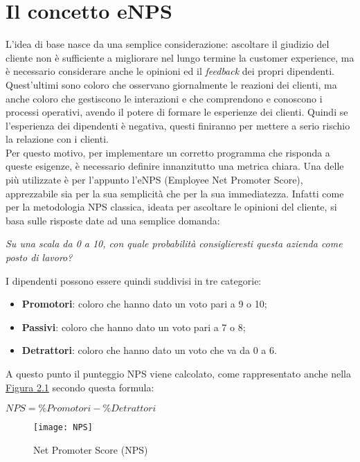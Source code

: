 \section{Il concetto eNPS}
\label{concetto eNPS}
L'idea di base nasce da una semplice considerazione: ascoltare il giudizio del cliente non è sufficiente a migliorare nel lungo termine la \gls{customer experience}, ma è necessario considerare anche le opinioni ed il \textit{feedback} dei propri dipendenti. Quest'ultimi sono coloro che osservano giornalmente le reazioni dei clienti, ma anche coloro che gestiscono le interazioni e che comprendono e conoscono i processi operativi, avendo il potere di formare le esperienze dei clienti. Quindi se l'esperienza dei dipendenti è negativa, questi finiranno per mettere a serio rischio la relazione con i clienti. \\
Per questo motivo, per implementare un corretto programma che risponda a queste esigenze, è necessario definire innanzitutto una metrica chiara. Una delle più utilizzate è per l'appunto l'eNPS (Employee Net Promoter Score), apprezzabile sia per la sua semplicità che per la sua immediatezza. Infatti come per la metodologia NPS classica, ideata per ascoltare le opinioni del cliente, si basa sulle risposte date ad una semplice domanda:
\begin{center}
\emph{Su una scala da 0 a 10, con quale probabilità consiglieresti questa azienda come posto di lavoro?}
\end{center}
I dipendenti possono essere quindi suddivisi in tre categorie:
\begin{itemize}
\item \textbf{Promotori}: coloro che hanno dato un voto pari a 9 o 10;
\item \textbf{Passivi}: coloro che hanno dato un voto pari a 7 o 8;
\item \textbf{Detrattori}: coloro che hanno dato un voto che va da 0 a 6.
\end{itemize}
A questo punto il punteggio NPS viene calcolato, come rappresentato anche nella \hyperref[NPS]{Figura 2.1} secondo questa formula:
\begin{center}
$ NPS = \%Promotori - \%Detrattori $
\end{center}

\begin{figure}[ht]
\begin{center}
\texttt{[image: NPS]}
\caption{Net Promoter Score (NPS)}
\label{NPS}
\end{center}
\end{figure}
\FloatBarrier

